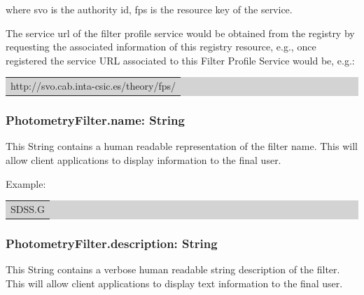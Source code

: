 \documentclass[11pt,a4paper]{ivoa}
\begin{document}

where svo is the authority id, fps is the resource key of the service.
\par

The service url of the filter profile service would be obtained from the registry by requesting the associated information of this registry resource, e.g., once registered the service URL associated to this Filter Profile Service would be, e.g.:
\par

\bigskip
\par
\begingroup\setlength{\fboxsep}{0pt}
\colorbox{lightgray}{%
\begin{tabular}{|p{5.53in}|}
http://svo.cab.inta-csic.es/theory/fps/
\end{tabular}%
}\endgroup
\par
\bigskip


\subsubsection{PhotometryFilter.name: String}
This String contains a human readable representation of the filter name. This will allow client applications to display information to the final user.
\par

Example:
\par

\bigskip
\begingroup\setlength{\fboxsep}{0pt}
\colorbox{lightgray}{%
\begin{tabular}{|p{5.53in}|}
SDSS.G
\end{tabular}%
}\endgroup
\par
\bigskip




\subsubsection{PhotometryFilter.description: String}
This String contains a verbose human readable string description of the filter. This will allow client applications to display text information to the final user.
\par
\end{document}
